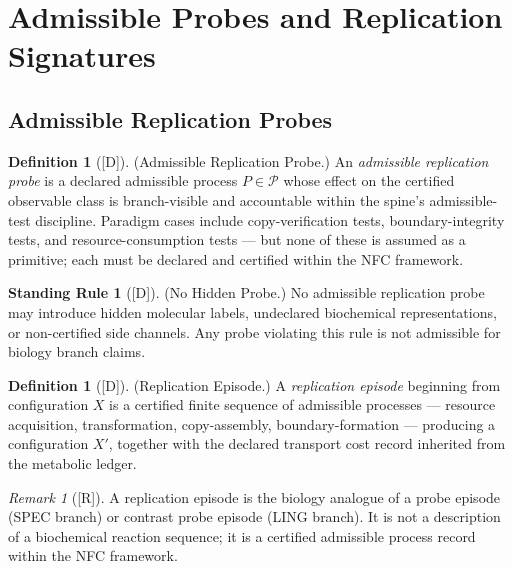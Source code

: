 \documentclass[12pt,oneside]{amsbook}
\theoremstyle{plain}
\theoremstyle{definition}
\newtheorem{definition}[theorem]{Definition}
\newtheorem{standingrule}[theorem]{Standing Rule}
\theoremstyle{remark}
\newtheorem{remark}[theorem]{Remark}
\newcommand{\status}[1]{\textup{[#1]}}
\begin{document}
\section{Admissible Probes and Replication Signatures}
\label{sec:bio-probes}

\subsection{Admissible Replication Probes}\label{sec:bio-admissible-probes}

\begin{definition}[\status{D}]\label{def:bio-admissible-probe}
\textup{(Admissible Replication Probe.)}
An \emph{admissible replication probe} is a declared admissible
process $P \in \mathcal{P}$ whose effect on the certified observable
class is branch-visible and accountable within the spine's
admissible-test discipline. Paradigm cases include copy-verification
tests, boundary-integrity tests, and resource-consumption tests ---
but none of these is assumed as a primitive; each must be declared
and certified within the NFC framework.
\end{definition}

\begin{standingrule}[\status{D}]\label{sr:bio-no-hidden-probe}
\textup{(No Hidden Probe.)}
No admissible replication probe may introduce hidden molecular labels,
undeclared biochemical representations, or non-certified side channels.
Any probe violating this rule is not admissible for biology branch
claims.
\end{standingrule}

\begin{definition}[\status{D}]\label{def:bio-replication-episode}
\textup{(Replication Episode.)}
A \emph{replication episode} beginning from configuration $X$ is a
certified finite sequence of admissible processes --- resource
acquisition, transformation, copy-assembly, boundary-formation ---
producing a configuration $X'$, together with the declared transport
cost record inherited from the metabolic ledger.
\end{definition}

\begin{remark}[\status{R}]\label{rem:bio-episode-note}
A replication episode is the biology analogue of a probe episode
(SPEC branch) or contrast probe episode (LING branch). It is not
a description of a biochemical reaction sequence; it is a certified
admissible process record within the NFC framework.
\end{remark}
\end{document}
